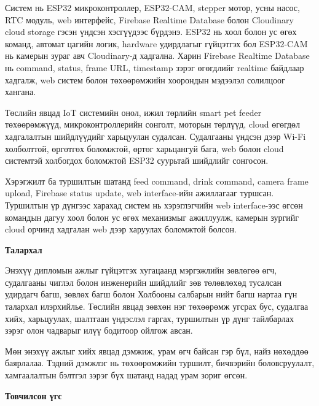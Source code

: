 \documentclass[12pt,a4paper]{report}
\begin{document}
Систем нь ESP32 микроконтроллер, ESP32-CAM, stepper мотор, усны насос, RTC модуль, web интерфейс, Firebase Realtime Database болон Cloudinary cloud storage гэсэн үндсэн хэсгүүдээс бүрдэнэ. ESP32 нь хоол болон ус өгөх команд, автомат цагийн логик, hardware удирдлагыг гүйцэтгэх бол ESP32-CAM нь камерын зураг авч Cloudinary-д хадгална. Харин Firebase Realtime Database нь command, status, frame URL, timestamp зэрэг өгөгдлийг realtime байдлаар хадгалж, web систем болон төхөөрөмжийн хоорондын мэдээлэл солилцоог хангана.

Төслийн явцад IoT системийн онол, ижил төрлийн smart pet feeder төхөөрөмжүүд, микроконтроллерийн сонголт, моторын төрлүүд, cloud өгөгдөл хадгалалтын шийдлүүдийг харьцуулан судалсан. Судалгааны үндсэн дээр Wi-Fi холболттой, өргөтгөх боломжтой, өртөг харьцангуй бага, web болон cloud системтэй холбогдох боломжтой ESP32 суурьтай шийдлийг сонгосон.

Хэрэгжилт ба туршилтын шатанд feed command, drink command, camera frame upload, Firebase status update, web interface-ийн ажиллагааг туршсан. Туршилтын үр дүнгээс харахад систем нь хэрэглэгчийн web interface-ээс өгсөн командын дагуу хоол болон ус өгөх механизмыг ажиллуулж, камерын зургийг cloud орчинд хадгалан web дээр харуулах боломжтой болсон.

\newpage
\begin{center}
  \vspace*{1.5cm}
  {\huge\textbf{Талархал}}
\end{center}
\vspace{1cm}

\noindent Энэхүү дипломын ажлыг гүйцэтгэх хугацаанд мэргэжлийн зөвлөгөө өгч, судалгааны чиглэл болон инженерийн шийдлийг зөв төлөвлөхөд тусалсан удирдагч багш, зөвлөх багш болон Холбооны салбарын нийт багш нартаа гүн талархал илэрхийлье. Төслийн явцад зөвхөн нэг төхөөрөмж угсрах бус, судалгаа хийх, харьцуулах, шалтгаан үндэслэл гаргах, туршилтын үр дүнг тайлбарлах зэрэг олон чадварыг илүү бодитоор ойлгож авсан.

\noindent Мөн энэхүү ажлыг хийх явцад дэмжиж, урам өгч байсан гэр бүл, найз нөхөддөө баярлалаа. Тэдний дэмжлэг нь төхөөрөмжийн туршилт, бичвэрийн боловсруулалт, хамгаалалтын бэлтгэл зэрэг бүх шатанд надад урам зориг өгсөн.

\newpage
\begin{center}
  \vspace*{1.5cm}
  {\huge\textbf{Товчилсон үгс}}
\end{center}
\vspace{1cm}
\end{document}
